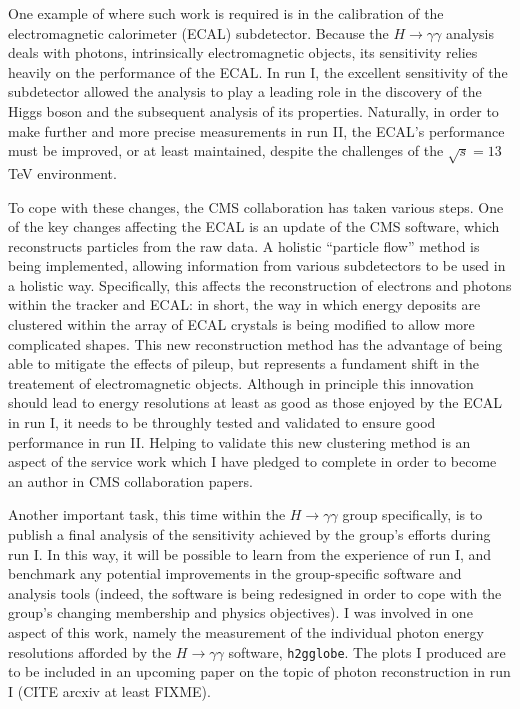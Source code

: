\documentclass[10pt]{article}
\begin{document}
One example of where such work is required is in the calibration of the electromagnetic calorimeter (ECAL) subdetector. Because the $H \rightarrow \gamma \gamma$ analysis deals with photons, intrinsically electromagnetic objects, its sensitivity relies heavily on the performance of the ECAL. In run I, the excellent sensitivity of the subdetector allowed the analysis to play a  leading role in the discovery of the Higgs boson and the subsequent analysis of its properties. Naturally, in order to make further and more precise measurements in run II, the ECAL's performance must be improved, or at least maintained, despite the challenges of the $\sqrt{s} = 13$TeV environment.

To cope with these changes, the CMS collaboration has taken various steps. One of the key changes affecting the ECAL is an update of the CMS software, which reconstructs particles from the raw data. A holistic ``particle flow'' method is being implemented, allowing information from various subdetectors to be used in a holistic way. Specifically, this affects the reconstruction of electrons and photons within the tracker and ECAL: in short, the way in which energy deposits are clustered within the array of ECAL crystals is being modified to allow more complicated shapes. This new reconstruction method has the advantage of being able to mitigate the effects of pileup, but represents a fundament shift in the treatement of electromagnetic objects. Although in principle this innovation should lead to energy resolutions at least as good as those enjoyed by the ECAL in run I, it needs to be throughly tested and validated to ensure good performance in run II. Helping to validate this new clustering method is an aspect of the service work which I have pledged to complete in order to become an author in CMS collaboration papers.

Another important task, this time within the $H \rightarrow \gamma \gamma$ group specifically, is to publish a final analysis of the sensitivity achieved by the group's efforts during run I. In this way, it will be possible to learn from the experience of run I, and benchmark any potential improvements in the group-specific software and analysis tools (indeed, the software is being redesigned in order to cope with the group's changing membership and physics objectives). I was involved in one aspect of this work, namely the measurement of the individual photon energy resolutions afforded by the $H \rightarrow \gamma \gamma$ software, \texttt{h2gglobe}. The plots I produced are to be included in an upcoming paper on the topic of photon reconstruction in run I (CITE arcxiv at least FIXME). 
\end{document}
